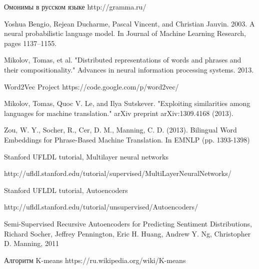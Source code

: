 \documentclass[12pt]{article}
\begin{document}
\begin{thebibliography}{0}

Омонимы в русском языке http://gramma.ru/

Yoshua Bengio, Rejean Ducharme, Pascal Vincent, and Christian Jauvin. 2003. A neural probabilistic language model. In Journal of Machine Learning Research, pages 1137–1155.

Mikolov, Tomas, et al. "Distributed representations of words and phrases and their compositionality." Advances in neural information processing systems. 2013.

Word2Vec Project https://code.google.com/p/word2vec/

Mikolov, Tomas, Quoc V. Le, and Ilya Sutskever. "Exploiting similarities among languages for machine translation." arXiv preprint arXiv:1309.4168 (2013).

Zou, W. Y., Socher, R., Cer, D. M., Manning, C. D. (2013). Bilingual Word Embeddings for Phrase-Based Machine Translation. In EMNLP (pp. 1393-1398)

Stanford UFLDL tutorial, Multilayer neural networks 

http://ufldl.stanford.edu/tutorial/supervised/MultiLayerNeuralNetworks/

Stanford UFLDL tutorial, Autoencoders

http://ufldl.stanford.edu/tutorial/unsupervised/Autoencoders/

Semi-Supervised Recursive Autoencoders for Predicting Sentiment Distributions, Richard Socher, Jeffrey Pennington, Eric H. Huang, Andrew Y. Ng, Christopher D. Manning, 2011

Алгоритм K-means https://ru.wikipedia.org/wiki/K-means

\end{thebibliography}
\end{document}
